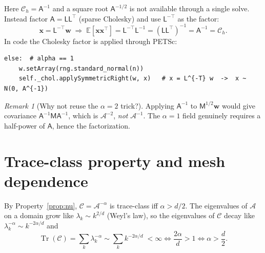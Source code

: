 \documentclass[11pt]{article}
\theoremstyle{definition}
\theoremstyle{plain}
\theoremstyle{remark}
\newtheorem{remark}{Remark}[section]
\newcommand{\E}{\mathbb{E}}
\newcommand{\Cc}{\mathcal{C}}
\newcommand{\Ac}{\mathcal{A}}
\newcommand{\Tr}{\operatorname{Tr}}
\newcommand{\Mmat}{\mathsf{M}}
\newcommand{\Amat}{\mathsf{A}}
\newcommand{\Lmat}{\mathsf{L}}
\newcommand{\bx}{\bm{x}}
\newcommand{\bw}{\bm{w}}
\begin{document}
Here $\Cc_h = \Amat^{-1}$ and a square root $\Amat^{-1/2}$ is not available
through a single solve. Instead factor $\Amat = \Lmat\Lmat^\top$ (sparse
Cholesky) and use $\Lmat^{-\top}$ as the factor:
\begin{equation}
  \bx = \Lmat^{-\top}\bw
  \;\Longrightarrow\;
  \E[\bx\bx^\top] = \Lmat^{-\top}\Lmat^{-1} = (\Lmat\Lmat^\top)^{-1}
    = \Amat^{-1} = \Cc_h .
  \label{eq:sample-alpha1}
\end{equation}
In code the Cholesky factor is applied through PETSc:
\begin{lstlisting}
else:  # alpha == 1
    w.setArray(rng.standard_normal(n))
    self._chol.applySymmetricRight(w, x)   # x = L^{-T} w  ->  x ~ N(0, A^{-1})
\end{lstlisting}

\begin{remark}[Why not reuse the $\alpha=2$ trick?]
Applying $\Amat^{-1}$ to $\Mmat^{1/2}\bw$ would give covariance
$\Amat^{-1}\Mmat\Amat^{-1}$, which is $\Ac^{-2}$, \emph{not} $\Ac^{-1}$. The
$\alpha=1$ field genuinely requires a half-power of $\Amat$, hence the
factorization.
\end{remark}

\section{Trace-class property and mesh dependence}
\label{sec:traceclass}

By Property~\ref{prop:nu}, $\Cc=\Ac^{-\alpha}$ is trace-class iff $\alpha>d/2$.
The eigenvalues of $\Ac$ on a domain grow like $\lambda_k \sim k^{2/d}$
(Weyl's law), so the eigenvalues of $\Cc$ decay like $\lambda_k^{-\alpha}\sim
k^{-2\alpha/d}$ and
\begin{equation}
  \Tr(\Cc) = \sum_{k} \lambda_k^{-\alpha}
           \sim \sum_k k^{-2\alpha/d}
           \;<\infty
  \iff \frac{2\alpha}{d} > 1
  \iff \alpha > \frac{d}{2}.
\end{equation}
\end{document}
